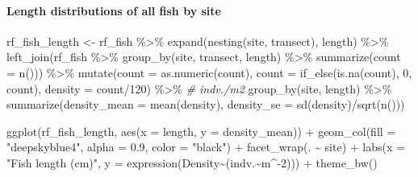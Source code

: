 \documentclass[
]{article}
\newenvironment{Shaded}{\begin{snugshade}}{\end{snugshade}}
\newcommand{\AttributeTok}[1]{\textcolor[rgb]{0.77,0.63,0.00}{#1}}
\newcommand{\CommentTok}[1]{\textcolor[rgb]{0.56,0.35,0.01}{\textit{#1}}}
\newcommand{\DecValTok}[1]{\textcolor[rgb]{0.00,0.00,0.81}{#1}}
\newcommand{\FloatTok}[1]{\textcolor[rgb]{0.00,0.00,0.81}{#1}}
\newcommand{\FunctionTok}[1]{\textcolor[rgb]{0.00,0.00,0.00}{#1}}
\newcommand{\NormalTok}[1]{#1}
\newcommand{\OtherTok}[1]{\textcolor[rgb]{0.56,0.35,0.01}{#1}}
\newcommand{\SpecialCharTok}[1]{\textcolor[rgb]{0.00,0.00,0.00}{#1}}
\newcommand{\StringTok}[1]{\textcolor[rgb]{0.31,0.60,0.02}{#1}}
\begin{document}
\hypertarget{length-distributions-of-all-fish-by-site}{%
\paragraph{Length distributions of all fish by
site}\label{length-distributions-of-all-fish-by-site}}

\begin{Shaded}
\begin{Highlighting}[]
\NormalTok{rf\_fish\_length }\OtherTok{\textless{}{-}}\NormalTok{ rf\_fish }\SpecialCharTok{\%\textgreater{}\%}
  \FunctionTok{expand}\NormalTok{(}\FunctionTok{nesting}\NormalTok{(site, transect), length) }\SpecialCharTok{\%\textgreater{}\%}
  \FunctionTok{left\_join}\NormalTok{(rf\_fish }\SpecialCharTok{\%\textgreater{}\%}
        \FunctionTok{group\_by}\NormalTok{(site, transect, length) }\SpecialCharTok{\%\textgreater{}\%}
        \FunctionTok{summarize}\NormalTok{(}\AttributeTok{count =} \FunctionTok{n}\NormalTok{())) }\SpecialCharTok{\%\textgreater{}\%}
  \FunctionTok{mutate}\NormalTok{(}\AttributeTok{count =} \FunctionTok{as.numeric}\NormalTok{(count),}
         \AttributeTok{count =} \FunctionTok{if\_else}\NormalTok{(}\FunctionTok{is.na}\NormalTok{(count), }\DecValTok{0}\NormalTok{, count),}
         \AttributeTok{density =}\NormalTok{ count}\SpecialCharTok{/}\DecValTok{120}\NormalTok{) }\SpecialCharTok{\%\textgreater{}\%} \CommentTok{\# indv./m2}
  \FunctionTok{group\_by}\NormalTok{(site, length) }\SpecialCharTok{\%\textgreater{}\%}
  \FunctionTok{summarize}\NormalTok{(}\AttributeTok{density\_mean =} \FunctionTok{mean}\NormalTok{(density),}
            \AttributeTok{density\_se =} \FunctionTok{sd}\NormalTok{(density)}\SpecialCharTok{/}\FunctionTok{sqrt}\NormalTok{(}\FunctionTok{n}\NormalTok{()))}

\FunctionTok{ggplot}\NormalTok{(rf\_fish\_length, }\FunctionTok{aes}\NormalTok{(}\AttributeTok{x =}\NormalTok{ length, }\AttributeTok{y =}\NormalTok{ density\_mean)) }\SpecialCharTok{+}
  \FunctionTok{geom\_col}\NormalTok{(}\AttributeTok{fill =} \StringTok{"deepskyblue4"}\NormalTok{, }\AttributeTok{alpha =} \FloatTok{0.9}\NormalTok{, }\AttributeTok{color =} \StringTok{"black"}\NormalTok{) }\SpecialCharTok{+}
  \FunctionTok{facet\_wrap}\NormalTok{(. }\SpecialCharTok{\textasciitilde{}}\NormalTok{ site) }\SpecialCharTok{+}
  \FunctionTok{labs}\NormalTok{(}\AttributeTok{x =} \StringTok{"Fish length (cm)"}\NormalTok{, }\AttributeTok{y =} \FunctionTok{expression}\NormalTok{(Density}\SpecialCharTok{\textasciitilde{}}\NormalTok{(indv.}\SpecialCharTok{\textasciitilde{}}\NormalTok{m}\SpecialCharTok{\^{}{-}}\DecValTok{2}\NormalTok{))) }\SpecialCharTok{+}
  \FunctionTok{theme\_bw}\NormalTok{()}
\end{Highlighting}
\end{Shaded}
\end{document}
